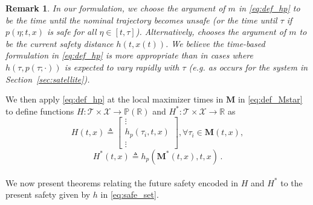 \documentclass[10pt,conference]{ieeeconf}
\renewcommand{\(}{\left(}
\renewcommand{\)}{\right)}
\renewcommand{\[}{\left[}
\renewcommand{\]}{\right]}
\newcommand{\reals}{\mathbb{R}}
\newtheorem{remark}{Remark}
\newcommand{\extendedversion}[1]{{\color{black}#1}}
\begin{document}
\begin{remark}
In our formulation, we choose the argument of $m$ in \eqref{eq:def_hp} to be the time until the {nominal trajectory becomes unsafe \extendedversion{(or the time until $\tau$ if $p(\eta;t,x)$ is safe for all $\eta\in[t,\tau]$)}}. Alternatively, \cite[Eq. 38]{mitchells_paper} chooses the argument of $m$ to be the current safety distance $h(t,x(t))$. We believe the time-based formulation in {\eqref{eq:def_hp}} is more appropriate than \cite[Eq. 38]{mitchells_paper} in cases where $h(\tau,p(\tau;\cdot))$ is expected to vary rapidly with $\tau$ (e.g. as occurs for the system in Section~\ref{sec:satellite}).
\end{remark}

We then apply \eqref{eq:def_hp} at the {local maximizer times} in $\boldsymbol{M}$ in \eqref{eq:def_Mstar} to define functions $H:\mathcal{T}\times\mathcal{X}\rightarrow\mathbb{P}(\reals)$ and $H^*:\mathcal{T}\times\mathcal{X}\rightarrow\reals$ as
\vspace{-5pt}\begin{equation}
    H(t,x) \triangleq \begin{bmatrix} \vdots \\ h_p(\tau_i, t, x)\\ \vdots \end{bmatrix}, \forall \tau_i\in\boldsymbol{M}(t,x), \label{eq:def_H}
\end{equation}\vspace{-5pt}
\begin{equation}
    H^*(t,x) \triangleq h_p(\boldsymbol{M}^*(t,x), t, x) \,. \label{eq:def_Hstar}
\end{equation} \vspace{-14pt} \\
We now present theorems relating the future safety encoded in $H$ and $H^*$ to the present safety given by $h$ in \eqref{eq:safe_set}.

\end{document}
